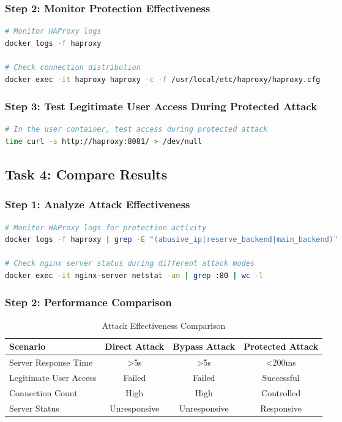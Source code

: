 \documentclass[12pt]{article}
\begin{document}
\subsubsection{Step 2: Monitor Protection Effectiveness}
\begin{lstlisting}[language=bash]
# Monitor HAProxy logs
docker logs -f haproxy

# Check connection distribution
docker exec -it haproxy haproxy -c -f /usr/local/etc/haproxy/haproxy.cfg
\end{lstlisting}

\subsubsection{Step 3: Test Legitimate User Access During Protected Attack}
\begin{lstlisting}[language=bash]
# In the user container, test access during protected attack
time curl -s http://haproxy:8081/ > /dev/null
\end{lstlisting}

\subsection{Task 4: Compare Results}

\subsubsection{Step 1: Analyze Attack Effectiveness}
\begin{lstlisting}[language=bash]
# Monitor HAProxy logs for protection activity
docker logs -f haproxy | grep -E "(abusive_ip|reserve_backend|main_backend)"

# Check nginx server status during different attack modes
docker exec -it nginx-server netstat -an | grep :80 | wc -l
\end{lstlisting}

\subsubsection{Step 2: Performance Comparison}
\begin{table}[H]
\centering
\begin{tabular}{|l|c|c|c|}
\hline
\textbf{Scenario} & \textbf{Direct Attack} & \textbf{Bypass Attack} & \textbf{Protected Attack} \\
\hline
Server Response Time & >5s & >5s & <200ms \\
\hline
Legitimate User Access & Failed & Failed & Successful \\
\hline
Connection Count & High & High & Controlled \\
\hline
Server Status & Unresponsive & Unresponsive & Responsive \\
\hline
\end{tabular}
\caption{Attack Effectiveness Comparison}
\label{tab:attack_comparison}
\end{table}
\end{document}
